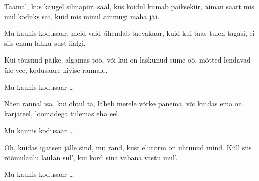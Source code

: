 Taamal, kus kaugel silmapiir,
s\"a\"al, kus koidul kumab p\"aiksekiir,
aiman saart mis mul koduks sai,
kuid mis minul ammugi maha j\"ai.

Mu kaunis kodusaar,
meid vaid \"uhendab taevakaar,
kuid kui taas tulen tagasi,
ei siis enam lahku sust iialgi.

Kui t\~ousnud p\"aike, algamas t\"o\"o,
v\~oi kui on laskunud sume \"o\"o,
m\~otted lendavad \"ule vee,
kodusaare kivise rannale.

Mu kaunis kodusaar \ldots

N\"aen rannal isa, kui \~ohtul ta,
l\"aheb merele v\~orke panema,
v\~oi kuidas ema on karjateel,
loomadega tulemas eha eel.

Mu kaunis kodusaar \ldots

Oh, kuidas igatsen j\"alle sind,
mu rand, kust elutorm on uhtunud mind.
K\"ull siis r\~o\~omulaulu laulan sul',
kui kord sina vabana vastu mul'.

Mu kaunis kodusaar \ldots